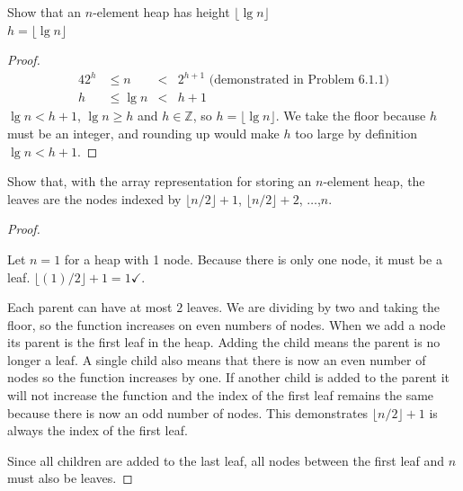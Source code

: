 \documentclass[12pt]{article}
\newcommand{\Z}{\mathbb{Z}}
\newenvironment{problem}[2][Problem]{\begin{trivlist}
\item[\hskip \labelsep {\bfseries #1}\hskip \labelsep {\bfseries #2.}]}{\end{trivlist}}
\begin{document}
\newpage
\begin{problem}{6.1-2} Show that an $n$-element heap has height $\lfloor \lg n \rfloor$ \\
  \claim $h = \lfloor \lg n \rfloor$
  \begin{proof}
    \begin{alignat*}{4}
      2^{h} &\le n &<& 2^{h+1} \text{ (demonstrated in Problem 6.1.1)} \\
      h &\le \lg n &<& h+1
    \end{alignat*}
    $\lg n < h + 1$, $\lg n \ge h$ and $h \in \Z$, so $h = \lfloor \lg n \rfloor$. We take
    the floor because $h$ must be an integer, and rounding up would make $h$ too large by definition $\lg n < h + 1$.
  \end{proof}
\end{problem}

\begin{problem}{6.1-7} Show that, with the array representation for storing an $n$-element heap, the leaves are the nodes indexed
  by $\lfloor n/2 \rfloor + 1$, $\lfloor n/2 \rfloor + 2$, $\ldots$,$n$.
  \begin{proof}\ \\


    Let $n = 1$ for a heap with 1 node.
    Because there is only one node, it must be a leaf. $\lfloor (1)/2 \rfloor + 1 = 1\checkmark$. \\


     Each parent can have at most $2$ leaves. We are dividing by two and taking the floor, so the function increases on even numbers of nodes.
     When we add a node its parent is the first leaf in the heap. Adding the child means the parent is no longer a leaf. A single child also means that there is now an even
     number of nodes so the function increases by one. If another child is added to the parent it will not increase the function
     and the index of the first leaf remains the same because there is now an odd number of nodes. This demonstrates $\lfloor n/2 \rfloor + 1$ is always the index of the first leaf.

     Since all children are added to the last leaf, all nodes between the first leaf and $n$ must also be leaves.
  \end{proof}
\end{problem} \newpage
\end{document}
